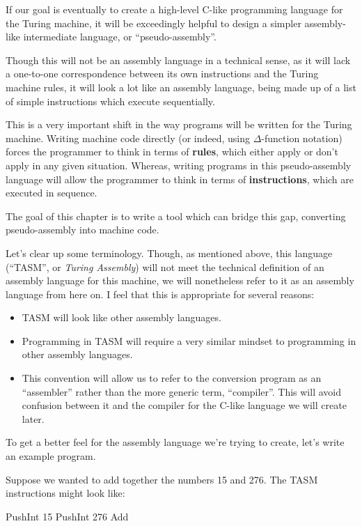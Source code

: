 If our goal is eventually to create a high-level C-like programming language for the Turing machine, it will be exceedingly helpful to design a simpler assembly-like intermediate language, or ``pseudo-assembly''.

Though this will not be an assembly language in a technical sense, as it will lack a one-to-one correspondence between its own instructions and the Turing machine rules, it will look a lot like an assembly language, being made up of a list of simple instructions which execute sequentially.

This is a very important shift in the way programs will be written for the Turing machine. Writing machine code directly (or indeed, using $\Delta$-function notation) forces the programmer to think in terms of \textbf{rules}, which either apply or don't apply in any given situation. Whereas, writing programs in this pseudo-assembly language will allow the programmer to think in terms of \textbf{instructions}, which are executed in sequence.

The goal of this chapter is to write a tool which can bridge this gap, converting pseudo-assembly into machine code.

Let's clear up some terminology. Though, as mentioned above, this language (``TASM'', or \textit{Turing Assembly}) will not meet the technical definition of an assembly language for this machine, we will nonetheless refer to it as an assembly language from here on. I feel that this is appropriate for several reasons:

\begin{itemize}
    \item TASM will look like other assembly languages.
    \item Programming in TASM will require a very similar mindset to programming in other assembly languages.
    \item This convention will allow us to refer to the conversion program as an ``assembler'' rather than the more generic term, ``compiler''. This will avoid confusion between it and the compiler for the C-like language we will create later.
\end{itemize}

To get a better feel for the assembly language we're trying to create, let's write an example program.

Suppose we wanted to add together the numbers 15 and 276. The TASM instructions might look like:

\begin{stdout}
PushInt 15
PushInt 276
Add
\end{stdout}

